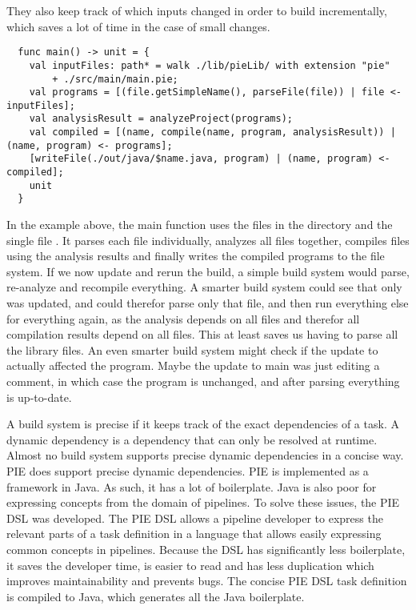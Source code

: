 They also keep track of which inputs changed in order to build incrementally, which saves a lot of time in the case of small changes.
\begin{lstlisting}
  func main() -> unit = {
    val inputFiles: path* = walk ./lib/pieLib/ with extension "pie"
        + ./src/main/main.pie;
    val programs = [(file.getSimpleName(), parseFile(file)) | file <- inputFiles];
    val analysisResult = analyzeProject(programs);
    val compiled = [(name, compile(name, program, analysisResult)) | (name, program) <- programs];
    [writeFile(./out/java/$name.java, program) | (name, program) <- compiled];
    unit
  }
\end{lstlisting}
In the example above, the main function uses the files in the directory  and the single file .
It parses each file individually, analyzes all files together, compiles files using the analysis results and finally writes the compiled programs to the file system.
If we now update  and rerun the build, a simple build system would parse, re-analyze and recompile everything.
A smarter build system could see that only  was updated, and could therefor parse only that file, and then run everything else for everything again, as the analysis depends on all files and therefor all compilation results depend on all files.
This at least saves us having to parse all the library files.
An even smarter build system might check if the update to  actually affected the program.
Maybe the update to main was just editing a comment, in which case the program is unchanged, and after parsing  everything is up-to-date.

A build system is precise if it keeps track of the exact dependencies of a task.
A dynamic dependency is a dependency that can only be resolved at runtime.
Almost no build system supports precise dynamic dependencies in a concise way.
\Ac{PIE} does support precise dynamic dependencies.
\Ac{PIE} is implemented as a framework in Java.
As such, it has a lot of boilerplate.
Java is also poor for expressing concepts from the domain of pipelines.
To solve these issues, the \ac{PIE} \ac{DSL} was developed.
The \ac{PIE} \ac{DSL} allows a pipeline developer to express the relevant parts of a task definition in a language that allows easily expressing common concepts in pipelines.
Because the \ac{DSL} has significantly less boilerplate, it saves the developer time, is easier to read and has less duplication which improves maintainability and prevents bugs. 
The concise \ac{PIE} \ac{DSL} task definition is compiled to Java, which generates all the Java boilerplate.

